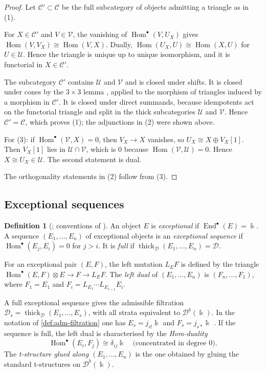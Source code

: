 \documentclass[11pt,reqno]{amsart}
\theoremstyle{plain}
\theoremstyle{definition}
\newtheorem{definition}[theorem]{Definition}
\theoremstyle{remark}
\newcommand{\kk}{\Bbbk}
\DeclareMathOperator{\Hom}{Hom}
\DeclareMathOperator{\End}{End}
\newcommand{\Db}{\mathcal{D}^b}
\newcommand{\thick}[2][\cD]{\operatorname{thick}_{#1}(#2)}
\newcommand{\cD}{\mathcal{D}}
\newcommand{\cC}{\mathcal{C}}
\newcommand{\cU}{\mathcal{U}}
\newcommand{\cV}{\mathcal{V}}
\begin{document}
\begin{proof}
Let $\cC'\subset\cC$ be the full subcategory of objects admitting a triangle as in (1).

For $X\in\cC'$ and $V\in\cV$, the vanishing of $\Hom^\bullet(V,U_X)$ gives $\Hom(V,V_X)\cong\Hom(V,X)$. Dually, $\Hom(U_X,U)\cong\Hom(X,U)$ for $U\in\cU$. Hence the triangle is unique up to unique isomorphism, and it is functorial in $X\in\cC'$.

The subcategory $\cC'$ contains $\cU$ and $\cV$ and is closed under shifts. It is closed under cones by the $3\times3$ lemma \cite[Prop.~1.1.11]{BBD82}, applied to the morphism of triangles induced by a morphism in $\cC'$. It is closed under direct summands, because idempotents act on the functorial triangle and split in the thick subcategories $\cU$ and $\cV$. Hence $\cC'=\cC$, which proves (1); the adjunctions in (2) were shown above.

For (3): if $\Hom^\bullet(\cV,X)=0$, then $V_X\to X$ vanishes, so $U_X\cong X\oplus V_X[1]$. Then $V_X[1]$ lies in $\cU\cap\cV$, which is $0$ because $\Hom(\cV,\cU)=0$. Hence $X\cong U_X\in\cU$. The second statement is dual.

The orthogonality statements in (2) follow from (3).
\end{proof}

\subsection{Exceptional sequences}

\begin{definition}[{\cite{Bon89}; conventions of \cite{BB26}}]
An object $E$ is \emph{exceptional} if $\End^\bullet(E)=\kk$. A sequence $(E_1,\dots,E_n)$ of exceptional objects is an \emph{exceptional sequence} if $\Hom^\bullet(E_j,E_i)=0$ for $j>i$. It is \emph{full} if $\thick{E_1,\dots,E_n}=\cD$.

For an exceptional pair $(E,F)$, the left mutation $L_EF$ is defined by the triangle $\Hom^\bullet(E,F)\otimes E\to F\to L_EF$. The \emph{left dual} of $(E_1,\dots,E_n)$ is $(F_n,\dots,F_1)$, where $F_1=E_1$ and $F_i=L_{E_1}\cdots L_{E_{i-1}}E_i$.
\end{definition}

A full exceptional sequence gives the admissible filtration $\cD_s=\thick{E_1,\dots,E_s}$, with all strata equivalent to $\Db(\kk)$. In the notation of \cref{def:adm-filtration} one has $E_s=j_{s!}\kk$ and $F_s=j_{s*}\kk$ \cite[\S2.4]{BB26}. If the sequence is full, the left dual is characterised by the \emph{Hom-duality}
\begin{equation}\label{eq:hom-duality-exc}
\Hom^\bullet(E_i,F_j)\cong\delta_{ij}\kk\quad\text{(concentrated in degree $0$)}.
\end{equation}
The \emph{t-structure glued along $(E_1,\dots,E_n)$} is the one obtained by gluing the standard t-structures on $\Db(\kk)$.
\end{document}

